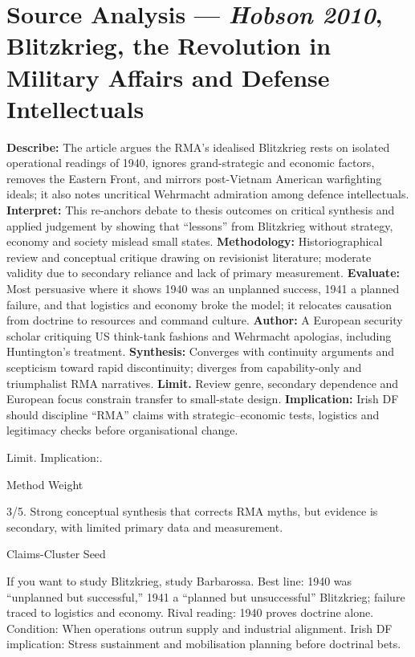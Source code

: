 \section*{Source Analysis — \textit{Hobson 2010}, Blitzkrieg, the Revolution in Military Affairs and Defense Intellectuals}
\textbf{Describe:} The article argues the RMA’s idealised Blitzkrieg rests on isolated operational readings of 1940, ignores grand-strategic and economic factors, removes the Eastern Front, and mirrors post-Vietnam American warfighting ideals; it also notes uncritical Wehrmacht admiration among defence intellectuals.
\textbf{Interpret:} This re-anchors debate to thesis outcomes on critical synthesis and applied judgement by showing that “lessons” from Blitzkrieg without strategy, economy and society mislead small states.
\textbf{Methodology:} Historiographical review and conceptual critique drawing on revisionist literature; moderate validity due to secondary reliance and lack of primary measurement.
\textbf{Evaluate:} Most persuasive where it shows 1940 was an unplanned success, 1941 a planned failure, and that logistics and economy broke the model; it relocates causation from doctrine to resources and command culture.
\textbf{Author:} A European security scholar critiquing US think-tank fashions and Wehrmacht apologias, including Huntington’s treatment.
\textbf{Synthesis:} Converges with continuity arguments and scepticism toward rapid discontinuity; diverges from capability-only and triumphalist RMA narratives.
\textbf{Limit.} Review genre, secondary dependence and European focus constrain transfer to small-state design.
\textbf{Implication:} Irish DF should discipline “RMA” claims with strategic–economic tests, logistics and legitimacy checks before organisational change.

Limit. Implication:.

Method Weight

3/5. Strong conceptual synthesis that corrects RMA myths, but evidence is secondary, with limited primary data and measurement.

Claims-Cluster Seed

If you want to study Blitzkrieg, study Barbarossa.
Best line: 1940 was “unplanned but successful,” 1941 a “planned but unsuccessful” Blitzkrieg; failure traced to logistics and economy.
Rival reading: 1940 proves doctrine alone.
Condition: When operations outrun supply and industrial alignment.
Irish DF implication: Stress sustainment and mobilisation planning before doctrinal bets.

